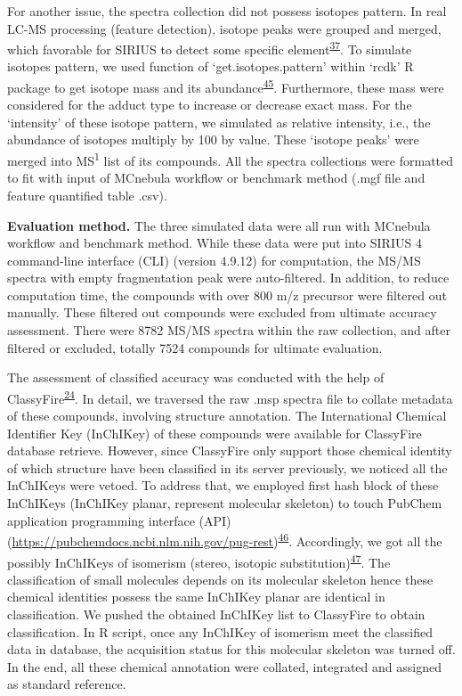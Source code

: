 \documentclass[
]{article}
\begin{document}
For another issue, the spectra collection did not possess isotopes
pattern. In real LC-MS processing (feature detection), isotope peaks
were grouped and merged, which favorable for SIRIUS to detect some
specific
element\textsuperscript{\protect\hyperlink{ref-bocker_sirius_2009}{37}}.
To simulate isotopes pattern, we used function of `get.isotopes.pattern'
within `rcdk' R package to get isotope mass and its
abundance\textsuperscript{\protect\hyperlink{ref-2007j}{45}}.
Furthermore, these mass were considered for the adduct type to increase
or decrease exact mass. For the `intensity' of these isotope pattern, we
simulated as relative intensity, i.e., the abundance of isotopes
multiply by 100 by value. These `isotope peaks' were merged into
MS\textsuperscript{1} list of its compounds. All the spectra collections
were formatted to fit with input of MCnebula workflow or benchmark
method (.mgf file and feature quantified table .csv).

\textbf{Evaluation method.} The three simulated data were all run with
MCnebula workflow and benchmark method. While these data were put into
SIRIUS 4 command-line interface (CLI) (version 4.9.12) for computation,
the MS/MS spectra with empty fragmentation peak were auto-filtered. In
addition, to reduce computation time, the compounds with over 800 m/z
precursor were filtered out manually. These filtered out compounds were
excluded from ultimate accuracy assessment. There were 8782 MS/MS
spectra within the raw collection, and after filtered or excluded,
totally 7524 compounds for ultimate evaluation.

The assessment of classified accuracy was conducted with the help of
ClassyFire\textsuperscript{\protect\hyperlink{ref-2016}{24}}. In detail,
we traversed the raw .msp spectra file to collate metadata of these
compounds, involving structure annotation. The International Chemical
Identifier Key (InChIKey) of these compounds were available for
ClassyFire database retrieve. However, since ClassyFire only support
those chemical identity of which structure have been classified in its
server previously, we noticed all the InChIKeys were vetoed. To address
that, we employed first hash block of these InChIKeys (InChIKey planar,
represent molecular skeleton) to touch PubChem application programming
interface (API)
(\url{https://pubchemdocs.ncbi.nlm.nih.gov/pug-rest})\textsuperscript{\protect\hyperlink{ref-2022ak}{46}}.
Accordingly, we got all the possibly InChIKeys of isomerism (stereo,
isotopic
substitution)\textsuperscript{\protect\hyperlink{ref-2012e}{47}}. The
classification of small molecules depends on its molecular skeleton
hence these chemical identities possess the same InChIKey planar are
identical in classification. We pushed the obtained InChIKey list to
ClassyFire to obtain classification. In R script, once any InChIKey of
isomerism meet the classified data in database, the acquisition status
for this molecular skeleton was turned off. In the end, all these
chemical annotation were collated, integrated and assigned as standard
reference.
\end{document}
